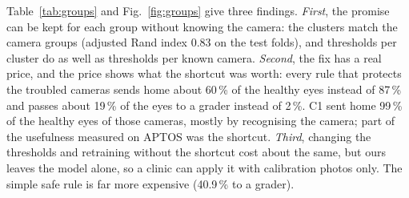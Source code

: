 \documentclass[10pt,twocolumn,letterpaper]{article}
\newcommand{\pct}{\,\%}
\begin{document}
Table~\ref{tab:groups} and Fig.~\ref{fig:groups} give three findings. \emph{First}, the promise can be kept for each group without knowing the camera: the clusters match the camera groups (adjusted Rand index 0.83 on the test folds), and thresholds per cluster do as well as thresholds per known camera. \emph{Second}, the fix has a real price, and the price shows what the shortcut was worth: every rule that protects the troubled cameras sends home about 60\pct{} of the healthy eyes instead of 87\pct{} and passes about 19\pct{} of the eyes to a grader instead of 2\pct. C1 sent home 99\pct{} of the healthy eyes of those cameras, mostly by recognising the camera; part of the usefulness measured on APTOS was the shortcut. \emph{Third}, changing the thresholds and retraining without the shortcut cost about the same, but ours leaves the model alone, so a clinic can apply it with calibration photos only. The simple safe rule is far more expensive (40.9\pct{} to a grader).
\end{document}
